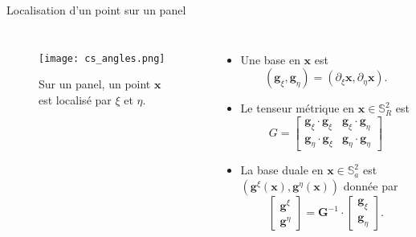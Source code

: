 \documentclass[11pt]{beamer}
\begin{document}
\begin{frame}{Localisation d'un point sur un panel}
\begin{columns}
\begin{figure}[htbp]
\begin{center}
\texttt{[image: cs\_angles.png]}
\end{center}
\caption{Sur un panel, un point $\mathbf{x}$ est localisé par $\xi$ et $\eta$.}
\label{fig: panel I xi eta}
\end{figure}
\begin{itemize}
\item Une base en $\mathbf{x}$ est $$(\mathbf{g}_{\xi}, \mathbf{g}_{\eta}) = (\partial_{\xi} \mathbf{x}, \partial_{\eta} \mathbf{x}).$$

\item Le tenseur métrique en $\mathbf{x} \in \mathbb{S}_R^2$ est
\begin{equation*}
G=\begin{bmatrix}
\mathbf{g}_{\xi} \cdot \mathbf{g}_{\xi} & \mathbf{g}_{\xi} \cdot \mathbf{g}_{\eta} \\
\mathbf{g}_{\eta} \cdot \mathbf{g}_{\xi} & \mathbf{g}_{\eta} \cdot \mathbf{g}_{\eta} 
\end{bmatrix}
\end{equation*}

\item La base duale en $\mathbf{x} \in \mathbb{S}^2_a $ est $(\mathbf{g}^\xi(\mathbf{x}),\mathbf{g}^\eta(\mathbf{x}))$ donnée par
$$
\begin{bmatrix}
\mathbf{g}^{\xi} \\ \mathbf{g}^{\eta} 
\end{bmatrix}
=
\mathbf{G}^{-1} \cdot
\begin{bmatrix}
\mathbf{g}_{\xi} \\ \mathbf{g}_{\eta} 
\end{bmatrix}.
$$
\end{itemize}
\end{columns}
\end{frame}
\end{document}
